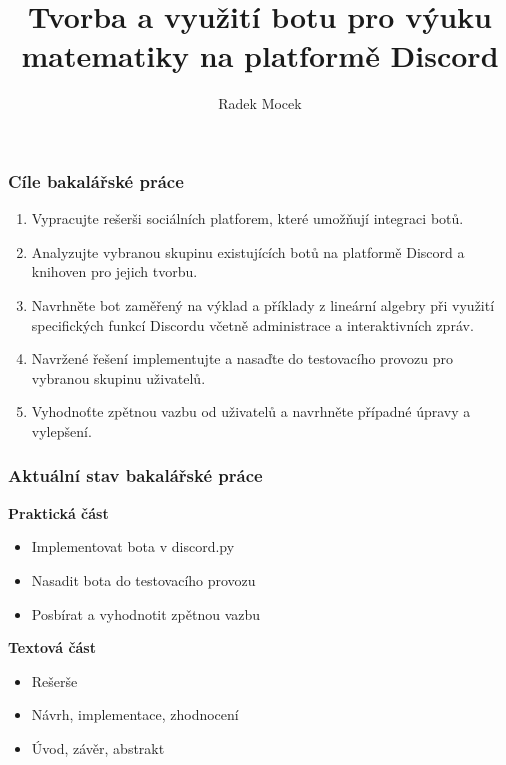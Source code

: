 \documentclass[FM]{tulpresentation}
\title{Tvorba a využití botu pro výuku matematiky na platformě Discord}
\author{Radek Mocek}
\newcommand{\OO}{\item[$\square$]}
\newcommand{\XX}{\item[\rlap{\raisebox{0.3ex}{\hspace{0.4ex}\ding{52}}}$\square$]}
\begin{document}
	\TULtitleframe
	\begin{frame}
		\frametitle{Cíle bakalářské práce}
		\begin{enumerate}
			\item Vypracujte rešerši sociálních platforem, které umožňují integraci botů.
			\item Analyzujte vybranou skupinu existujících botů na platformě Discord a knihoven pro jejich tvorbu.
			\item Navrhněte bot zaměřený na výklad a příklady z lineární algebry při využití specifických funkcí Discordu včetně administrace a interaktivních zpráv.
			\item Navržené řešení implementujte a nasaďte do testovacího provozu pro vybranou skupinu uživatelů.
			\item Vyhodnoťte zpětnou vazbu od uživatelů a navrhněte případné úpravy a vylepšení.
		\end{enumerate}
	\end{frame}
	\begin{frame}
		\frametitle{Aktuální stav bakalářské práce}
		\bigskip
		\textbf{Praktická část}
		\begin{itemize}
			\XX Implementovat bota v discord.py
			\XX Nasadit bota do testovacího provozu
			\OO Posbírat a vyhodnotit zpětnou vazbu
		\end{itemize}
		\bigskip
		\textbf{Textová část}
		\begin{itemize}
			\XX Rešerše
			\OO Návrh, implementace, zhodnocení
			\OO Úvod, závěr, abstrakt
		\end{itemize}
	\end{frame}
\end{document}
